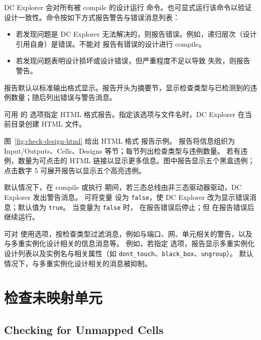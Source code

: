 DC Explorer 会对所有被 compile 的设计运行  命令。也可显式运行该命令以验证设计一致性。命令按如下方式报告警告与错误消息列表：
\begin{itemize}
  \item 若发现问题是 DC Explorer 无法解决的，则报告错误。例如，递归层次（设计引用自身）是错误。不能对  报告有错误的设计进行 compile。
  \item 若发现问题表明设计损坏或设计错误，但严重程度不足以导致  失败，则报告警告。
\end{itemize}

报告默认以标准输出格式显示。报告开头为摘要节，显示检查类型与已检测到的违例数量；随后列出错误与警告消息。

可用  的  选项指定 HTML 格式报告。指定该选项与文件名时，DC Explorer 在当前目录创建 HTML 文件。

图~\ref{fig:check-design-html} 给出 HTML 格式  报告示例。
报告将信息组织为 Input/Outputs、Cells、Designs 等节；每节列出检查类型与违例数量。
若有违例，数量为可点击的 HTML 链接以显示更多信息。图中报告显示五个黑盒违例；点击数字 5 可展开报告以显示五个高亮违例。


默认情况下，在 compile 或执行  期间，若三态总线由非三态驱动器驱动，DC Explorer 发出警告消息。
可将变量  设为 \texttt{false}，使 DC Explorer 改为显示错误消息；默认值为 \texttt{true}。
当变量为 \texttt{false} 时， 在报告错误后停止；但  在报告错误后继续运行。

可对  使用选项，按检查类型过滤消息，例如与端口、网、单元相关的警告，以及与多重实例化设计相关的信息消息等。
例如，若指定  选项，报告显示多重实例化设计列表以及实例名与相关属性（如 \texttt{dont\_touch}、\texttt{black\_box}、\texttt{ungroup}）。
默认情况下，与多重实例化设计相关的消息被抑制。

\section{检查未映射单元}
\subsection*{Checking for Unmapped Cells}


